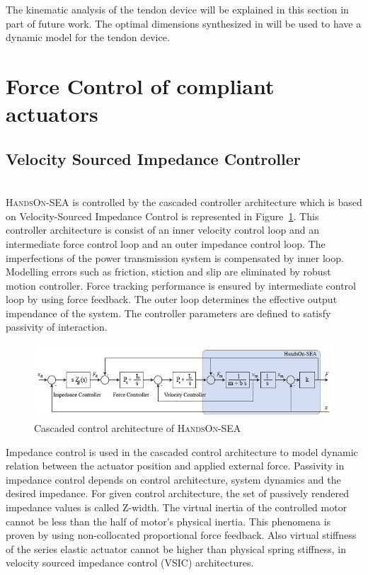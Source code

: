 \documentclass[a4paper,12pt]{article}
\begin{document}
The kinematic analysis of the tendon device will be explained in this section in part of future work. The optimal dimensions synthesized in\cite{ertas} will be used to have a dynamic model for the tendon device.

\section{Force Control of compliant actuators}
\subsection{Velocity Sourced Impedance Controller}\\
\textsc{HandsOn-SEA} is controlled by the cascaded controller architecture which is based on Velocity-Sourced Impedance Control\cite{tagliamonte} is represented in Figure~\ref{fig:handson}. This controller architecture is consist of an inner velocity control loop and an intermediate force control loop and an outer impedance control loop. The imperfections of the power transmission system is compensated by inner loop. Modelling errors such as friction, stiction and slip are eliminated by robust motion controller. Force tracking performance is ensured by intermediate control loop by using force feedback. The outer loop determines the effective output impendance of the system. The controller parameters are defined to satisfy passivity of interaction\cite{tagliamonte}.


\begin{figure}[h]
\centering
\includegraphics[scale=0.6]{Untitled.png}
\caption{Cascaded control architecture of \textsc{HandsOn-SEA}  }
\label{fig:handson}
\end{figure}
Impedance control is used in the cascaded control architecture to model dynamic relation between the actuator position and applied external force. Passivity in impedance control depends on control architecture, system dynamics and the desired impedance. For given control architecture, the set of passively rendered impedance values is called Z-width\cite{adamsblake}. The virtual inertia of the controlled motor cannot be less than the half of motor's physical inertia. This phenomena is proven by using non-collocated proportional force feedback\cite{colgate}. Also virtual stiffness of the series elastic actuator cannot be higher than physical spring stiffness, in velocity sourced impedance control (VSIC) architectures\cite{vallery}.\\
\end{document}
